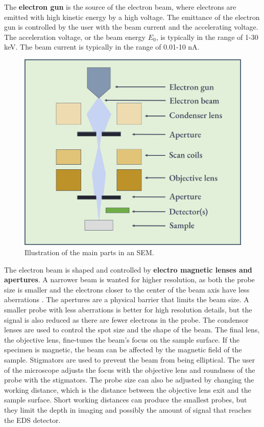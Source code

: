 The \textbf{electron gun} is the source of the electron beam, where electrons are emitted with high kinetic energy by a high voltage.
The emittance of the electron gun is controlled by the user with the beam current and the accelerating voltage.
The acceleration voltage, or the beam energy $E_0$, is typically in the range of 1-30 keV.
The beam current is typically in the range of 0.01-10 nA.


\begin{figure}[ht]
    \centering
    \includegraphics[width=0.8\linewidth]{figures/SEM_setup.png}
    \caption{
        Illustration of the main parts in an SEM.
    }
    \label{fig:SEM_setup}
\end{figure}


The electron beam is shaped and controlled by \textbf{electro magnetic lenses and apertures}.
A narrower beam is wanted for higher resolution, as both the probe size is smaller and the electrons closer to the center of the beam axis have less aberrations \cite{goodhew_2001}.
The apertures are a physical barrier that limits the beam size.
A smaller probe with less aberrations is better for high resolution details, but the signal is also reduced as there are fewer electrons in the probe.
The condensor lenses are used to control the spot size and the shape of the beam.
The final lens, the objective lens, fine-tunes the beam's focus on the sample surface.
If the specimen is magnetic, the beam can be affected by the magnetic field of the sample.
Stigmators are used to prevent the beam from being elliptical.
The user of the microscope adjusts the focus with the objective lens and roundness of the probe with the stigmators.
The probe size can also be adjusted by changing the working distance, which is the distance between the objective lens exit and the sample surface.
Short working distances can produce the smallest probes, but they limit the depth in imaging and possibly the amount of signal that reaches the EDS detector.


